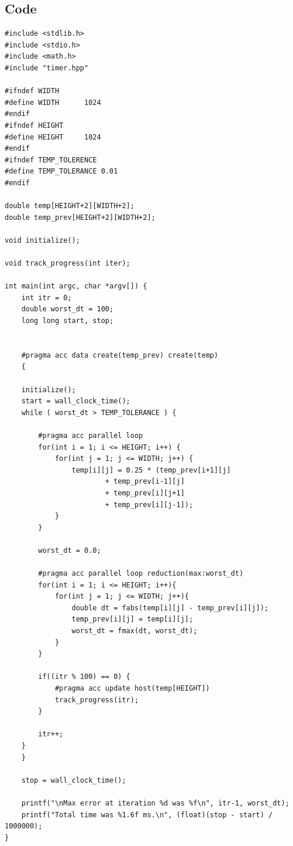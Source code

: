 \documentclass{article}
\begin{document}
\begin{appendices}
  \section{Code}
  \begin{verbatim}
#include <stdlib.h>
#include <stdio.h>
#include <math.h>
#include "timer.hpp"

#ifndef WIDTH
#define WIDTH      1024
#endif
#ifndef HEIGHT
#define HEIGHT     1024
#endif
#ifndef TEMP_TOLERENCE
#define TEMP_TOLERANCE 0.01
#endif

double temp[HEIGHT+2][WIDTH+2];
double temp_prev[HEIGHT+2][WIDTH+2];

void initialize();

void track_progress(int iter);

int main(int argc, char *argv[]) {
    int itr = 0;
    double worst_dt = 100;
    long long start, stop;


    #pragma acc data create(temp_prev) create(temp)
    {

    initialize();
    start = wall_clock_time();
    while ( worst_dt > TEMP_TOLERANCE ) {

        #pragma acc parallel loop
        for(int i = 1; i <= HEIGHT; i++) {
            for(int j = 1; j <= WIDTH; j++) {
                temp[i][j] = 0.25 * (temp_prev[i+1][j]
                        + temp_prev[i-1][j]
                        + temp_prev[i][j+1]
                        + temp_prev[i][j-1]);
            }
        }

        worst_dt = 0.0;

        #pragma acc parallel loop reduction(max:worst_dt)
        for(int i = 1; i <= HEIGHT; i++){
            for(int j = 1; j <= WIDTH; j++){
                double dt = fabs(temp[i][j] - temp_prev[i][j]);
                temp_prev[i][j] = temp[i][j];
                worst_dt = fmax(dt, worst_dt);
            }
        }

        if((itr % 100) == 0) {
            #pragma acc update host(temp[HEIGHT])
            track_progress(itr);
        }

        itr++;
    }
    }
    
    stop = wall_clock_time();

    printf("\nMax error at iteration %d was %f\n", itr-1, worst_dt);
    printf("Total time was %1.6f ms.\n", (float)(stop - start) / 1000000);
}


\end{verbatim}
\end{appendices}
\end{document}
